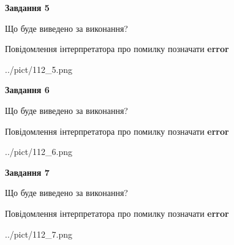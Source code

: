 \documentclass[10pt, ukrainian]{article}
\begin{document}
{\begin {large}
{\begin {center}\textbf{Завдання 5}\end {center}}\par
Що буде виведено за виконання? \par
Повідомлення інтерпретатора про помилку позначати \textbf{error}

\begin{center}
	{../pict/112_5.png}
\end{center}
\newpage

{\begin {center}\textbf{Завдання 6}\end {center}}\par
Що буде виведено за виконання? \par
Повідомлення інтерпретатора про помилку позначати \textbf{error}

\begin{center}
	{../pict/112_6.png}
\end{center}
\newpage

{\begin {center}\textbf{Завдання 7}\end {center}}\par
Що буде виведено за виконання? \par
Повідомлення інтерпретатора про помилку позначати \textbf{error}

\begin{center}
	{../pict/112_7.png}
\end{center}
\newpage

\end {large}}
\end{document}
